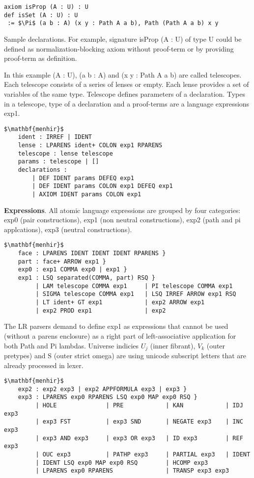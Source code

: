 \documentclass{article}
\begin{document}
\begin{lstlisting}[mathescape=true]
axiom isProp (A : U) : U
def isSet (A : U) : U
 := $\Pi$ (a b : A) (x y : Path A a b), Path (Path A a b) x y
\end{lstlisting}

Sample declarations. For example, signature isProp (A : U) of type U could be
defined as normalization-blocking axiom without proof-term or by providing proof-term as definition.

In this example (A : U), (a b : A) and (x y : Path A a b) are called telescopes.
Each telescope consists of a series of lenses or empty. Each lense provides a
set of variables of the same type. Telescope defines parameters of a declaration.
Types in a telescope, type of a declaration and a proof-terms are a language expressions exp1.

\begin{lstlisting}[mathescape=true]
$\mathbf{menhir}$
    ident : IRREF | IDENT
    lense : LPARENS ident+ COLON exp1 RPARENS
    telescope : lense telescope
    params : telescope | []
    declarations :
        | DEF IDENT params DEFEQ exp1
        | DEF IDENT params COLON exp1 DEFEQ exp1
        | AXIOM IDENT params COLON exp1
\end{lstlisting}

\textbf{Expressions}. All atomic language expressions are grouped by four categories:
exp0 (pair constructions), exp1 (non neutral constructions), exp2 (path and pi applcations),
exp3 (neutral constructions).

\begin{lstlisting}[mathescape=true]
$\mathbf{menhir}$
    face : LPARENS IDENT IDENT IDENT RPARENS }
    part : face+ ARROW exp1 }
    exp0 : exp1 COMMA exp0 | exp1 }
    exp1 : LSQ separated(COMMA, part) RSQ }
         | LAM telescope COMMA exp1     | PI telescope COMMA exp1
         | SIGMA telescope COMMA exp1   | LSQ IRREF ARROW exp1 RSQ
         | LT ident+ GT exp1            | exp2 ARROW exp1
         | exp2 PROD exp1               | exp2
\end{lstlisting}

The LR parsers demand to define exp1 as expressions that cannot be used (without a parens enclosure)
as a right part of left-associative application for both Path and Pi lambdas.
Universe indicies $U_j$ (inner fibrant), $V_k$ (outer pretypes) and S (outer strict omega)
are using unicode subscript letters that are already processed in lexer.

\begin{lstlisting}[mathescape=true]
$\mathbf{menhir}$
    exp2 : exp2 exp3 | exp2 APPFORMULA exp3 | exp3 }
    exp3 : LPARENS exp0 RPARENS LSQ exp0 MAP exp0 RSQ }
         | HOLE              | PRE            | KAN            | IDJ exp3
         | exp3 FST          | exp3 SND       | NEGATE exp3    | INC exp3
         | exp3 AND exp3     | exp3 OR exp3   | ID exp3        | REF exp3
         | OUC exp3          | PATHP exp3     | PARTIAL exp3   | IDENT
         | IDENT LSQ exp0 MAP exp0 RSQ        | HCOMP exp3
         | LPARENS exp0 RPARENS               | TRANSP exp3 exp3
\end{lstlisting}
\end{document}
